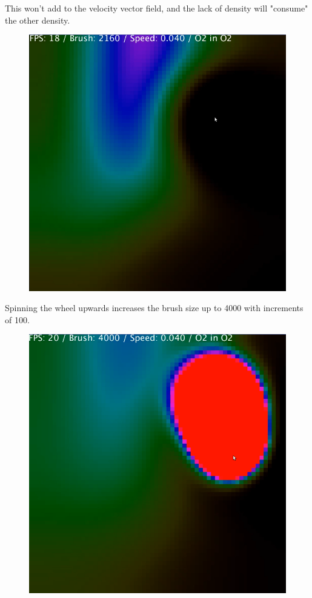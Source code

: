 \documentclass[12pt,a4paper]{book}
\begin{document}
\pagebreak
This won't add to the velocity vector field, and the lack of density will "consume" the other density.

\begin{figure}[H]
	\includegraphics[scale=0.5]{pics/5.png}
\end{figure}

\pagebreak
Spinning the wheel upwards increases the brush size up to 4000 with increments of 100.

\begin{figure}[H]
	\includegraphics[scale=0.5]{pics/6.png}
\end{figure}
\end{document}
